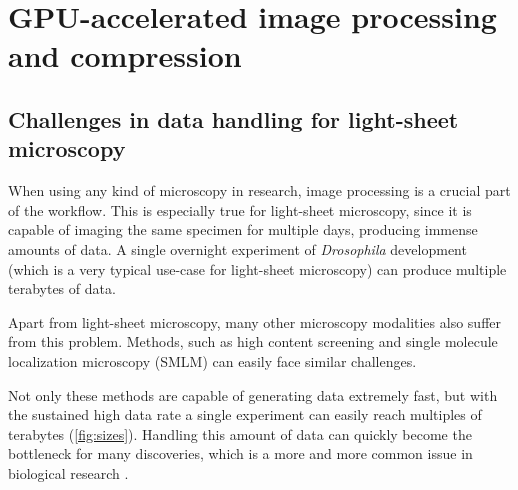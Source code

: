 

\chapter{GPU-accelerated image processing and compression}
\label{ch:GPU}
\graphicspath{{./figures/4_gpu/}}


\section{Challenges in data handling for light-sheet microscopy}

  
  \label{sec:sizes}

  When using any kind of microscopy in research, image processing is a crucial part of the workflow. This is especially true for light-sheet microscopy, since it is capable of imaging the same specimen for multiple days, producing immense amounts of data. A single overnight experiment of \textit{Drosophila} development (which is a very typical use-case for light-sheet microscopy) can produce multiple terabytes of data.

  Apart from light-sheet microscopy, many other microscopy modalities also suffer from this problem. Methods, such as high content screening \cite{carpenter_systematic_2004,echeverri_high-throughput_2006,pepperkok_high-throughput_2006}
  and single molecule localization microscopy (SMLM) \cite{betzig_imaging_2006,hess_ultra-high_2006,rust_sub-diffraction-limit_2006} can easily face similar challenges.

  Not only these methods are capable of generating data extremely fast, but with the sustained high data rate a single experiment can easily reach multiples of terabytes (\autoref{fig:sizes}). Handling this amount of data can quickly become the bottleneck for many discoveries, which is a more and more common issue in biological research \cite{wollman_high_2007,reynaud_guide_2015,perkel_struggle_2016}. 


